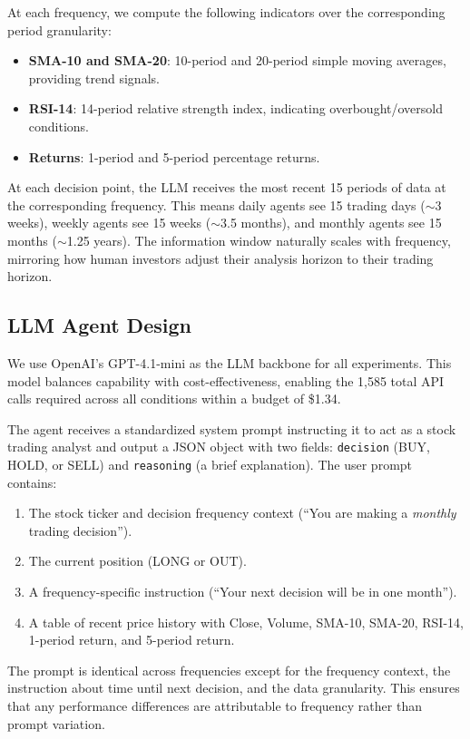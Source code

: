 At each frequency, we compute the following indicators over the corresponding period granularity:
\begin{itemize}[leftmargin=*,itemsep=0pt,topsep=0pt]
    \item \textbf{SMA-10 and SMA-20}: 10-period and 20-period simple moving averages, providing trend signals.
    \item \textbf{RSI-14}: 14-period relative strength index, indicating overbought/oversold conditions.
    \item \textbf{Returns}: 1-period and 5-period percentage returns.
\end{itemize}

At each decision point, the LLM receives the most recent 15 periods of data at the corresponding frequency. This means daily agents see 15 trading days ($\sim$3 weeks), weekly agents see 15 weeks ($\sim$3.5 months), and monthly agents see 15 months ($\sim$1.25 years). The information window naturally scales with frequency, mirroring how human investors adjust their analysis horizon to their trading horizon.

\subsection{LLM Agent Design}

We use OpenAI's GPT-4.1-mini as the LLM backbone for all experiments. This model balances capability with cost-effectiveness, enabling the 1,585 total API calls required across all conditions within a budget of \$1.34.

The agent receives a standardized system prompt instructing it to act as a stock trading analyst and output a JSON object with two fields: \texttt{decision} (BUY, HOLD, or SELL) and \texttt{reasoning} (a brief explanation). The user prompt contains:
\begin{enumerate}[leftmargin=*,itemsep=0pt,topsep=0pt]
    \item The stock ticker and decision frequency context (\eg ``You are making a \emph{monthly} trading decision'').
    \item The current position (LONG or OUT).
    \item A frequency-specific instruction (\eg ``Your next decision will be in one month'').
    \item A table of recent price history with Close, Volume, SMA-10, SMA-20, RSI-14, 1-period return, and 5-period return.
\end{enumerate}
The prompt is identical across frequencies except for the frequency context, the instruction about time until next decision, and the data granularity. This ensures that any performance differences are attributable to frequency rather than prompt variation.

